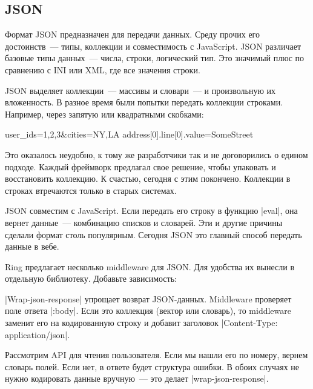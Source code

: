 \subsection{JSON}

Формат JSON предназначен для передачи данных. Среду прочих его достоинств~---
типы, коллекции и совместимость с JavaScript. JSON различает базовые типы
данных~--- числа, строки, логический тип. Это значимый плюс по сравнению с INI
или XML, где все значения строки.

JSON выделяет коллекции~--- массивы и словари~--- и произвольную их
вложенность. В разное время были попытки передать коллекции строками. Например,
через запятую или квадратными скобками:

\begin{english}
  \begin{text}
user_ids=1,2,3&cities=NY,LA
address[0].line[0].value=SomeStreet
  \end{text}
\end{english}

\noindent
Это оказалось неудобно, к тому же разработчики так и не договорились о едином
подходе. Каждый фреймворк предлагал свое решение, чтобы упаковать и восстановить
коллекцию. К счастью, сегодня с этим покончено. Коллекции в строках втречаются
только в старых системах.

JSON совместим с JavaScript. Если передать его строку в функцию \spverb|eval|,
она вернет данные~--- комбинацию списков и словарей. Эти и другие причины
сделали формат столь популярным. Сегодня JSON это главный способ передать данные
в вебе.

Ring предлагает несколько middleware для JSON. Для удобства их вынесли в
отдельную библиотеку. Добавьте зависимость:

\begin{english}
  \begin{clojure}
  \end{clojure}
\end{english}

\spverb|Wrap-json-response| упрощает возврат JSON-данных. Middleware проверяет
поле ответа \spverb|:body|. Если это коллекция (вектор или словарь), то
middleware заменит его на кодированную строку и добавит заголовок
\spverb|Content-Type: application/json|.

Рассмотрим API для чтения пользователя. Если мы нашли его по номеру, вернем
словарь полей. Если нет, в ответе будет структура ошибки. В обоих случаях не
нужно кодировать данные вручную~--- это делает \spverb|wrap-json-response|.

